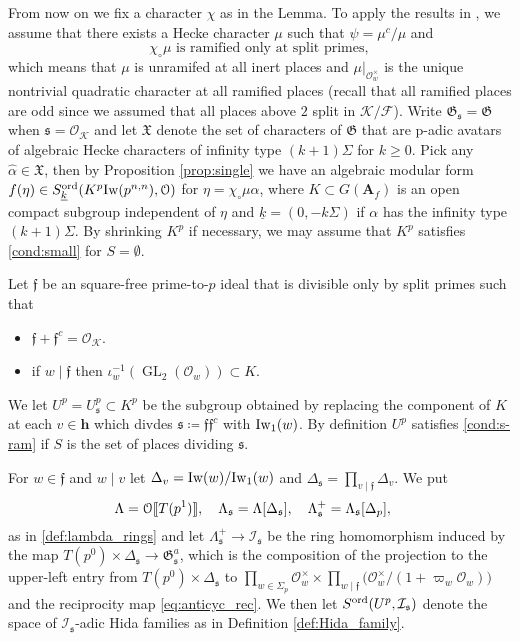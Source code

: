 \documentclass[leqno]{amsart}
\theoremstyle{definition}
\theoremstyle{remark}
\newcommand{\oo}{\mathcal{O}}
\newcommand{\eo}{\EuScript{O}}
\newcommand{\A}{\mathbf A}
\newcommand{\finite}{\mathbf{h}}
\DeclareMathOperator{\GL}{GL}
\newcommand{\ff}{\mathfrak{f}}
\newcommand{\fs}{\mathfrak{s}}
\newcommand{\F}{{\mathcal{F}}} %
\newcommand{\K}{{\mathcal{K}}} %
\newcommand{\fG}{\mathfrak{G}}
\newcommand{\fX}{\mathfrak{X}}
\newcommand{\wt}[1]{\underline{ #1 }}
\newcommand{\Iw}{\textnormal{Iw}} %
\newcommand{\I}{\mathcal{I}} %
\newcommand{\ord}{\textnormal{ord}} %
\begin{document}
From now on we fix a character $\chi$ as in the Lemma. 
To apply the results in \cite{lee},
we assume that there exists a Hecke character $\mu$
such that $\psi=\mu^c/\mu$ and
\begin{equation}\label{cond:can}\tag{can}
    \chi_\circ\mu \text{ is ramified only at split primes},
\end{equation}
which means that $\mu$ is unramifed at all inert places
and $\mu\vert_{\oo_w^\times}$
is the unique nontrivial quadratic character 
at all ramified places (recall that all ramified places are odd
since we assumed that all places above $2$ split in $\K/\F$).
Write $\fG_\fs=\fG$ when $\fs=\oo_\K$
and let $\fX$ denote the set of characters of $\fG$
that are p-adic avatars of algebraic Hecke characters 
of infinity type $(k+1)\Sigma$ for $k\geq0$. 
Pick any $\widehat{\alpha}\in\fX$,
then by Proposition \ref{prop:single}
we have an algebraic modular form 
$f(\eta)\in S^\ord_{\wt{k}}(K^p\Iw(p^{n,n}),\eo)$
for $\eta=\chi_\circ\mu\alpha$,
where $K\subset G(\A_f)$ is an open compact subgroup 
independent of $\eta$
and $\wt{k}=(0,-k\Sigma)$ if $\alpha$
has the infinity type $(k+1)\Sigma$.
By shrinking $K^p$ if necessary, we may assume that
$K^p$ satisfies \eqref{cond:small} for $S=\emptyset$.


Let $\ff$ be an square-free prime-to-$p$ ideal that is divisible
only by split primes such that 
\begin{itemize}
    \item $\ff+\ff^c=\oo_\K$.
    \item if $w\mid\ff$ then $\iota_w^{-1}(\GL_2(\oo_w))\subset K$.
\end{itemize}
We let $U^p=U_\fs^p\subset K^p$ be the subgroup obtained by 
replacing the component of $K$ at each 
$v\in\finite$ which divdes $\fs\coloneqq \ff\ff^c$
with $\Iw_1(w)$.
By definition $U^p$ satisfies \eqref{cond:s-ram}
if $S$ is the set of places dividing $\fs$.

For $w\in \ff$ and $w\mid v$
let $\Delta_v=\Iw(w)/\Iw_1(w)$
and $\Delta_{\fs}=\prod_{v\mid \ff}\Delta_v$.
We put 
\[
\Lambda=\eo\llbracket T(p^1)\rrbracket,\quad
\Lambda_\fs=\Lambda[\Delta_\fs],\quad
\Lambda_\fs^+=\Lambda_\fs[\Delta_p],\quad
\]
as in \eqref{def:lambda_rings}
and let $\Lambda^+_\fs\to \I_\fs$
be the ring homomorphism induced by 
the map $T(p^0)\times \Delta_{\fs}\to \fG_\fs^a$,
which is the composition of
the projection to the upper-left entry
from $T(p^0)\times \Delta_{\fs}$ to 
$\prod_{w\in \Sigma_p}\oo_w^\times\times 
\prod_{w\mid \ff}\big(\oo_w^\times/(1+\varpi_w\oo_w)\big)$
and the reciprocity map \eqref{eq:anticyc_rec}.
We then let $S^{\ord}(U^p,\I_\fs)$ 
denote the space of $\I_\fs$-adic Hida families
as in Definition \ref{def:Hida_family}.
\end{document}
